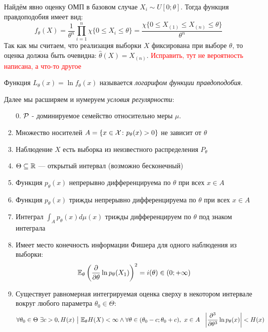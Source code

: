 \begin{example}
	Найдём явно оценку ОМП в базовом случае $X_i \sim U[0; \theta]$. Тогда функция правдоподобия имеет вид:
	\[
		f_\theta(X) = \frac{1}{\theta^n} \prod_{i = 1}^n \chi\{0 \le X_i \le \theta\} = \frac{\chi\{0 \le X_{(1)} \le X_{(n)} \le \theta\}}{\theta^n}
	\]
	Так как мы считаем, что реализация выборки $X$ фиксирована при выборе $\theta$, то оценка должна быть очевидна: $\hat{\theta}(X) = X_{(n)}$. \textcolor{red}{Исправить, тут не вероятность написана, а что-то другое}
\end{example}

\begin{definition}
	Функция $L_\theta(x) = \ln f_\theta(x)$ называется \textit{логарифом функции правдоподобия}.
\end{definition}

\begin{note}
	Далее мы расширяем и нумеруем \textit{условия регулярности}:
	\begin{enumerate}
		\item[0.] $\mathcal{P}$ - доминируемое семейство относительно меры $\mu$.
		
		\item Множество носителей $A = \{x \in \mathcal{X} \colon p_\theta(x) > 0\}$ не зависит от $\theta$
		
		\item Наблюдение $X$ есть выборка из неизвестного распределения $P_\theta$
		
		\item $\Theta \subseteq \mathbb{R}$ --- открытый интервал (возможно бесконечный)
		
		\item Функция $p_\theta(x)$ непрерывно дифференцируема по $\theta$ при всех $x \in A$
		
		\item Функция $p_\theta(x)$ трижды непрерывно дифференцируема по $\theta$ при всех $x \in A$
		
		\item Интеграл $\int_A p_\theta(x)d\mu(x)$ трижды дифференцируем по $\theta$ под знаком интеграла
		
		\item Имеет место конечность информации Фишера для одного наблюдения из выборки:
		\[
			\mathbb{E}_\theta\left(\frac{\partial }{\partial \theta} \ln p_\theta(X_1)\right)^2 = i(\theta) \in (0; +\infty)
		\]
		
		\item Существует равномерная интегрируемая оценка сверху в некотором интервале вокруг любого параметра $\theta_0 \in \Theta$:
		\[
			\forall \theta_0 \in \Theta\ \exists c > 0, H(x) \ \big|\  \mathbb{E}_\theta H(X) < \infty \wedge \forall \theta \in (\theta_0 - c; \theta_0 + c),\ x \in A\ \ \left|\frac{\partial ^3}{\partial \theta^3} \ln p_\theta(x)\right| < H(x)
		\]
	\end{enumerate}
\end{note}

